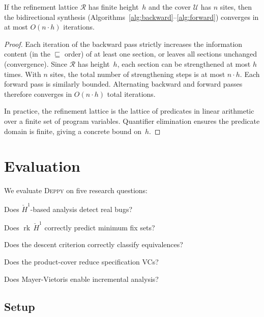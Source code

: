 \documentclass[acmsmall,screen]{acmart}
\theoremstyle{remark}
\newcommand{\Hc}[1]{\check{H}^{#1}}
\newcommand{\rk}{\operatorname{rk}}
\begin{document}
\begin{theorem}[Convergence]\label{thm:convergence}
If the refinement lattice $\mathcal{R}$ has finite height~$h$ and
the cover $\mathcal{U}$ has $n$ sites, then the bidirectional
synthesis (Algorithms~\ref{alg:backward}--\ref{alg:forward})
converges in at most $O(n \cdot h)$ iterations.
\end{theorem}

\begin{proof}
Each iteration of the backward pass strictly increases the information
content (in the $\sqsubseteq$ order) of at least one section, or
leaves all sections unchanged (convergence).  Since $\mathcal{R}$ has
height~$h$, each section can be strengthened at most $h$ times.  With
$n$ sites, the total number of strengthening steps is at most $n \cdot h$.
Each forward pass is similarly bounded.  Alternating backward and
forward passes therefore converges in $O(n \cdot h)$ total iterations.

In practice, the refinement lattice is the lattice of predicates in
linear arithmetic over a finite set of program variables.  Quantifier
elimination ensures the predicate domain is finite, giving a
concrete bound on~$h$.
\end{proof}

\section{Evaluation}\label{sec:evaluation}

We evaluate \textsc{Deppy} on five research questions:
\begin{description}[nosep]
  \item[RQ1] Does $\Hc{1}$-based analysis detect real bugs?
  \item[RQ2] Does $\rk\,\Hc{1}$ correctly predict minimum fix sets?
  \item[RQ3] Does the descent criterion correctly classify equivalences?
  \item[RQ4] Does the product-cover reduce specification VCs?
  \item[RQ5] Does Mayer-Vietoris enable incremental analysis?
\end{description}

\subsection{Setup}
\end{document}

